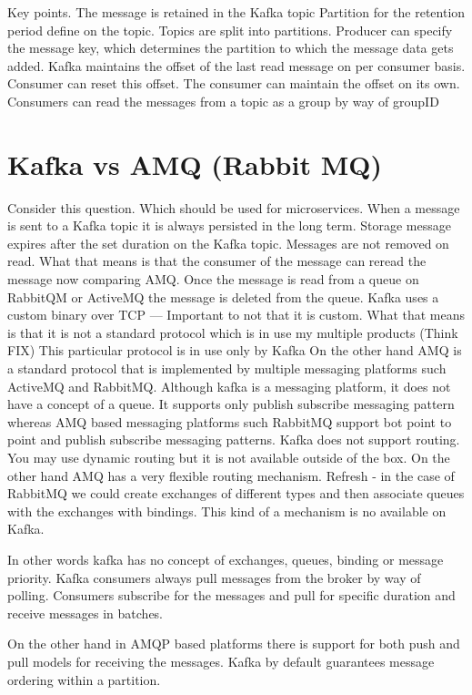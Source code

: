 Key points.
The message is retained in the Kafka topic Partition for the retention period define on the topic.
Topics are split into partitions.
Producer can specify the message key, which determines the partition to which the message data gets added.
Kafka maintains the offset of the last read message on per consumer basis.
Consumer can reset this offset.
The consumer can maintain the offset on its own.
Consumers can read the messages from a topic as a group by way of groupID



\section{Kafka vs AMQ (Rabbit MQ)}
Consider this question. Which should be used for microservices.
When a message is sent to a Kafka topic it is always persisted in the long term.
Storage message expires after the set duration on the Kafka topic.
Messages are not removed on read.
What that means is that the consumer of the message can reread the message now comparing AMQ.
Once the message is read from a queue on RabbitQM or ActiveMQ the message is deleted from the queue.
Kafka uses a custom binary over TCP
--- Important to not that it is custom.
What that means is that it is not a standard protocol which is in use my multiple products (Think FIX)
This particular protocol is in use only by Kafka
On the other hand AMQ is a standard protocol that is implemented by multiple messaging platforms such ActiveMQ and RabbitMQ.
Although kafka is a messaging platform, it does not have a concept of a queue.
It supports only publish subscribe messaging pattern whereas AMQ based messaging platforms such RabbitMQ support bot point to point and publish subscribe messaging patterns.
Kafka does not support routing.
You may use dynamic routing but it is not available outside of the box.
On the other hand AMQ has a very flexible routing mechanism.
Refresh - in the case of RabbitMQ we could create exchanges of different types and then associate queues with the exchanges with bindings.
This kind of a mechanism is no available on Kafka.

In other words kafka has no concept of exchanges, queues, binding or message priority.
Kafka consumers always pull messages from the broker by way of polling.
Consumers subscribe for the messages and pull for specific duration and receive messages in batches.

On the other hand in AMQP based platforms there is support for both push and pull models for receiving the messages.
Kafka by default guarantees message ordering within a partition.


